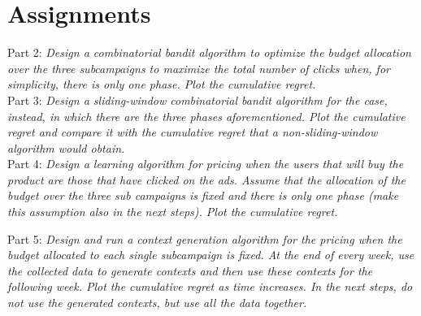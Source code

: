 \chapter{Assignments}

Part 2:
\textit{Design a combinatorial bandit algorithm to optimize the budget allocation over the three subcampaigns to maximize the total number of clicks when, for simplicity, there is only one phase. Plot the cumulative regret.}
\label{assPart2}\\

Part 3:
\textit{Design a sliding-window combinatorial bandit algorithm for the case, instead, in which there are the three phases aforementioned. Plot the cumulative regret and compare it with the cumulative regret that a non-sliding-window algorithm would obtain.}
\label{assPart3}\\

Part 4:
\textit{Design a learning algorithm for pricing when the users that will buy the product are those that have clicked on the ads. Assume that the allocation of the budget over the three sub campaigns is fixed and there is only one phase (make this assumption also in the next steps). Plot the cumulative regret.}\label{assPart4}

Part 5:
\textit{Design and run a context generation algorithm for the pricing when the budget allocated to each single subcampaign is fixed. At the end of every week, use the collected data to generate contexts and then use these contexts for the following week. Plot the cumulative regret as time increases. In the next steps, do not use the generated contexts, but use all the data together.}
\label{assPart5}\\